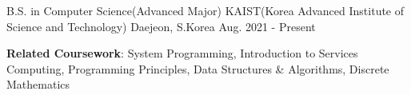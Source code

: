 

\begin{cventries}

  \cventry
    {B.S. in Computer Science(Advanced Major)} %
    {KAIST(Korea Advanced Institute of Science and Technology)} %
    {Daejeon, S.Korea} %
    {Aug. 2021 - Present} %
    {
      \begin{cvitems} %
        \item \textbf{Related Coursework}: System Programming, Introduction to Services Computing, Programming Principles, Data Structures \& Algorithms, Discrete Mathematics
      \end{cvitems}
    }
\end{cventries}
